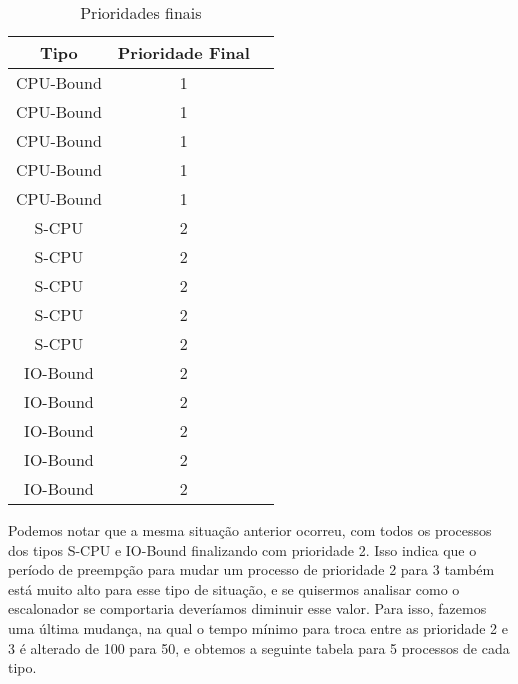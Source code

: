 \documentclass{article}
\begin{document}
\begin{table}[H]
      \centering
      \begin{tabular}{|c|c|c|}
            \hline
            \textbf{Tipo} & \textbf{Prioridade Final} \\
            \hline
            CPU-Bound     & 1                         \\
            CPU-Bound     & 1                         \\
            CPU-Bound     & 1                         \\
            CPU-Bound     & 1                         \\
            CPU-Bound     & 1                         \\
            S-CPU         & 2                         \\
            S-CPU         & 2                         \\
            S-CPU         & 2                         \\
            S-CPU         & 2                         \\
            S-CPU         & 2                         \\
            IO-Bound      & 2                         \\
            IO-Bound      & 2                         \\
            IO-Bound      & 2                         \\
            IO-Bound      & 2                         \\
            IO-Bound      & 2                         \\
            \hline
      \end{tabular}
      \caption{Prioridades finais}
\end{table}

Podemos notar que a mesma situação anterior ocorreu, com todos os processos dos
tipos S-CPU e IO-Bound finalizando com prioridade 2. Isso indica que o período
de preempção para mudar um processo de prioridade 2 para 3 também está muito alto
para esse tipo de situação, e se quisermos analisar como o escalonador se
comportaria deveríamos diminuir esse valor. Para isso, fazemos uma última
mudança, na qual o tempo mínimo para troca entre as prioridade 2 e 3 é alterado
de 100 para 50, e obtemos a seguinte tabela para 5 processos de cada tipo.
\end{document}
